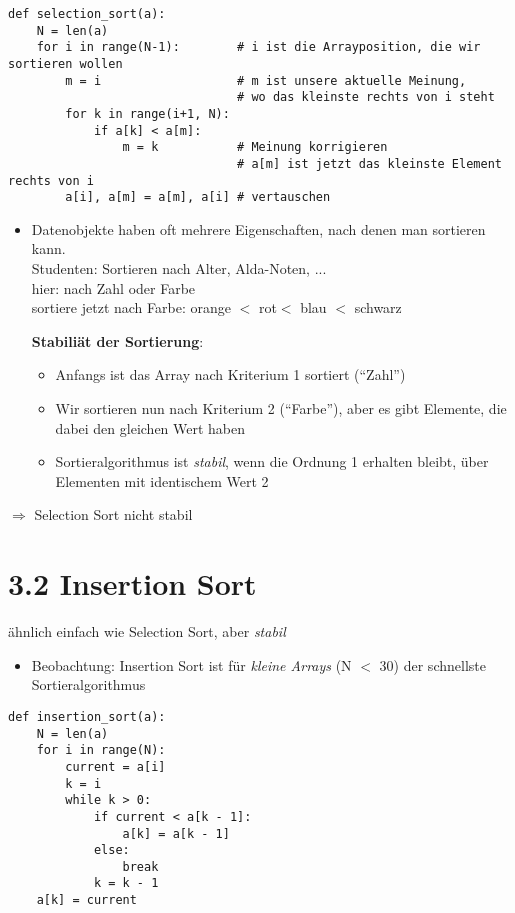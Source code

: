             \begin{verbatim}
def selection_sort(a):
    N = len(a)
    for i in range(N-1):        # i ist die Arrayposition, die wir sortieren wollen
        m = i                   # m ist unsere aktuelle Meinung,
                                # wo das kleinste rechts von i steht
        for k in range(i+1, N):
            if a[k] < a[m]:
                m = k           # Meinung korrigieren
                                # a[m] ist jetzt das kleinste Element rechts von i
        a[i], a[m] = a[m], a[i] # vertauschen
            \end{verbatim}
            \begin{itemize}
                \item Datenobjekte haben oft mehrere Eigenschaften, nach denen man sortieren kann. \\
                Studenten: Sortieren nach Alter, Alda-Noten, ... \\
                hier: nach Zahl oder Farbe\\
                sortiere jetzt nach Farbe: orange $<$ rot$ <$ blau $<$ schwarz

                \textbf{Stabiliät der Sortierung}:
                \begin{itemize}
                    \item Anfangs ist das Array nach Kriterium 1 sortiert (``Zahl'')
                    \item Wir sortieren nun nach Kriterium 2 (``Farbe''), aber es gibt Elemente, die dabei den gleichen Wert haben
                    \item Sortieralgorithmus ist \emph{stabil}, wenn die Ordnung 1 erhalten bleibt, über Elementen mit identischem Wert 2
                \end{itemize}
            \end{itemize}
            $\Rightarrow$ Selection Sort nicht stabil \\

            \section*{3.2 Insertion Sort}
            ähnlich einfach wie Selection Sort, aber \emph{stabil}
            \begin{itemize}
                \item Beobachtung: Insertion Sort ist für \emph{kleine Arrays} (N $<$ 30) der schnellste Sortieralgorithmus \\
            \end{itemize}
            \begin{verbatim}
def insertion_sort(a):
    N = len(a)
    for i in range(N):
        current = a[i]
        k = i
        while k > 0:
            if current < a[k - 1]:
                a[k] = a[k - 1]
            else:
                break
            k = k - 1
    a[k] = current
            \end{verbatim}

